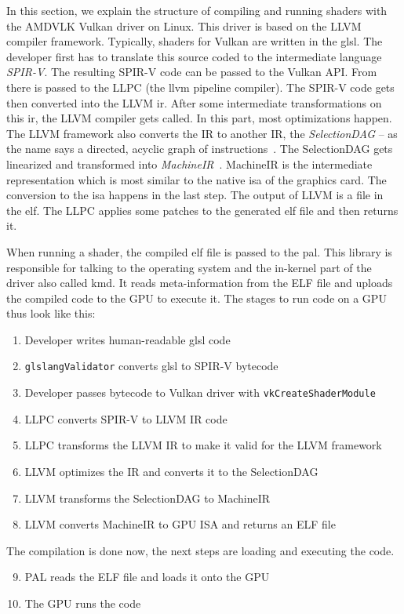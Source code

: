 In this section, we explain the structure of compiling and running shaders with the AMDVLK Vulkan driver on Linux. This driver is based on the LLVM compiler framework. Typically, shaders for Vulkan are written in the \gls{glsl}. The developer first has to translate this source coded to the intermediate language \emph{SPIR-V}. The resulting SPIR-V code can be passed to the Vulkan API. From there is passed to the LLPC (the llvm pipeline compiler). The SPIR-V code gets then converted into the LLVM \gls{ir}. After some intermediate transformations on this \gls{ir}, the LLVM compiler gets called. In this part, most optimizations happen.
The LLVM framework also converts the IR to another IR, the \emph{SelectionDAG} -- as the name says a directed, acyclic graph of instructions~\cite{llvmSelectionDag}. The SelectionDAG gets linearized and transformed into \emph{MachineIR}~\cite{llvmSelectionDag}. MachineIR is the intermediate representation which is most similar to the native \gls{isa} of the graphics card. The conversion to the \gls{isa} happens in the last step. The output of LLVM is a file in the \gls{elf}. The LLPC applies some patches to the generated \gls{elf} file and then returns it.

When running a shader, the compiled \gls{elf} file is passed to the \gls{pal}. This library is responsible for talking to the operating system and the in-kernel part of the driver also called \gls{kmd}. It reads meta-information from the ELF file and uploads the compiled code to the GPU to execute it. The stages to run code on a GPU thus look like this:

\begin{enumerate}
	\item Developer writes human-readable \gls{glsl} code
	\item \texttt{glslangValidator} converts \gls{glsl} to SPIR-V bytecode
	\item Developer passes bytecode to Vulkan driver with \texttt{vkCreateShaderModule}
	\item LLPC converts SPIR-V to LLVM IR code
	\item LLPC transforms the LLVM IR to make it valid for the LLVM framework
	\item LLVM optimizes the IR and converts it to the SelectionDAG
	\item LLVM transforms the SelectionDAG to MachineIR
	\item LLVM converts MachineIR to GPU ISA and returns an ELF file
\end{enumerate}
The compilation is done now, the next steps are loading and executing the code.
\begin{enumerate}
	\setcounter{enumi}{8}
	\item PAL reads the ELF file and loads it onto the GPU
	\item The GPU runs the code
\end{enumerate}

